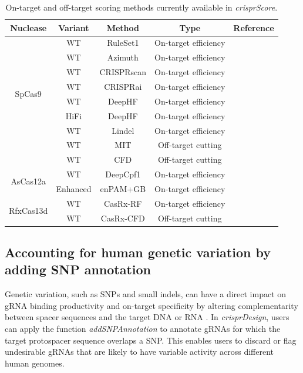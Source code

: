 \documentclass[pdftex,english,10pt]{article}
\begin{document}
\begin{table}[]
\centering
\small
\begin{tabular}{c|c|c|c|c}
Nuclease & Variant & Method & Type  & Reference  \\ \hline
\multirow{8}{*}{SpCas9}   
                  & WT & RuleSet1 & On-target efficiency    &  \citet{doench2014rational}\\ 
                  & WT & Azimuth & On-target efficiency  & \citet{azimuth}  \\
                  & WT & CRISPRscan & On-target efficiency  & \citet{crisprscan}  \\
                  & WT & CRISPRai & On-target efficiency  & \citet{crispria} \\
                  & WT & DeepHF & On-target efficiency   & \citet{deepcas9} \\
                  & HiFi & DeepHF & On-target efficiency   & \citet{deepcas9} \\
                  & WT & Lindel & On-target efficiency   & \citet{lindel} \\
                  & WT & MIT & Off-target cutting   & \citet{mit} \\
                  & WT & CFD & Off-target cutting   & \citet{doench2016optimized} \\ \hline
\multirow{2}{*}{AsCas12a} 
                  & WT& DeepCpf1 & On-target efficiency &  \citet{deepcpf1} \\
                  & Enhanced & enPAM+GB & On-target efficiency & \citet{enpamgb} \\ \hline
\multirow{2}{*}{RfxCas13d} 
                  & WT& CasRx-RF & On-target efficiency &  \citet{wessels2020massively} \\
                  & WT& CasRx-CFD & Off-target cutting &  \citet{crisprScore} \\
\end{tabular}
\caption{On-target and off-target scoring methods currently available in \textit{crisprScore}.}
\label{tab:crisprscore}
\end{table}



 
\subsection{Accounting for human genetic variation by adding SNP annotation}

Genetic variation, such as SNPs and small indels, can have a direct impact on gRNA binding productivity and on-target specificity by altering complementarity between spacer sequences and the target DNA or RNA \citep{scott2017implications, lessard2017human, canver2017variant, wang2018genetic}. 
In \textit{crisprDesign}, users can apply the function \textit{addSNPAnnotation} to annotate gRNAs for which the target protospacer sequence overlaps a SNP.
This enables users to discard or flag undesirable gRNAs that are likely to have variable activity across different human genomes.
\end{document}

